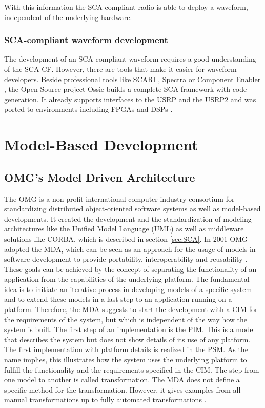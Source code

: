 With this information the SCA-compliant radio is able to deploy a waveform, independent of the underlying hardware.

\subsubsection{SCA-compliant waveform development}
The development of an SCA-compliant waveform requires a good understanding of the \ac{SCA} \ac{CF}. However, there are tools that make it easier for waveform developers. Beside professional tools like SCARI \cite{scari:website}, Spectra \cite{spectra:website} or Component Enabler \cite{ce:website}, the Open Source project Ossie \cite{ossie:website} builds a complete SCA framework with code generation. It already supports interfaces to the USRP and the USRP2 and was ported to environments including FPGAs \cite{ossie_fpga} and DSPs \cite{ossie_omap}. 

\section{Model-Based Development}
\label{sec:mbd}

\subsection{OMG's Model Driven Architecture}
The \ac{OMG} is a non-profit international computer industry consortium for standardizing distributed object-oriented software systems as well as model-based developments. It created the development and the standardization of modeling architectures like the Unified Model Language (UML) as well as middleware solutions like \ac{CORBA}, which is described in section \ref{sec:SCA}. In 2001 \ac{OMG} adopted the \ac{MDA}, which can be seen as an approach for the usage of models in software development to provide portability, interoperability and reusability \cite{MDAGuide}. These goals can be achieved by the concept of separating the functionality of an application from the capabilities of the underlying platform. The fundamental idea is to initiate an iterative process in developing models of a specific system and to extend these models in a last step to an application running on a platform. Therefore, the MDA suggests to start the development with a \ac{CIM} for the requirements of the system, but which is independent of the way how the system is built. The first step of an implementation is the \ac{PIM}. This is a model that describes the system but does not show details of its use of any platform. The first implementation with platform details is realized in the \ac{PSM}. As the name implies, this illustrates how the system uses the underlying platform to fulfill the functionality and the requirements specified in the \ac{CIM}. The step from one model to another is called transformation. The \ac{MDA} does not define a specific method for the transformation. However, it gives examples from all manual transformations up to fully automated transformations \cite{MDAGuide}.

